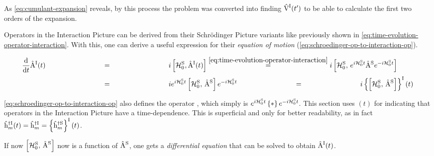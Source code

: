As \autoref{eq:cumulant-expansion} reveals, by this process the problem was converted into finding $\VhamiltonianOf[\interactionPicture]{t'}$ to be able to calculate the first two orders of the expansion.

Operators in the Interaction Picture can be derived from their Schrödinger Picture variants like previously shown in \autoref{eq:time-evolution-operator-interaction}. 
With this, one can derive a useful expression for their \emph{equation of motion} (\autoref{eq:schroedinger-op-to-interaction-op}).

\begin{equation}
    \label{eq:schroedinger-op-to-interaction-op}
    \begin{split}
        \difft{}\AopOfT[\interactionPicture] &\stackrel{\phantom{\ref{eq:time-evolution-operator-interaction}}}{=} i \left[\HzeroHamiltonian[\schroedingerPicture], \AopOfT[\interactionPicture]\right]
        \stackrel{\ref{eq:time-evolution-operator-interaction}}{=}
        i \left[\HzeroHamiltonian[\schroedingerPicture],\,e^{i \HzeroHamiltonian[\schroedingerPicture]{} t} \Aop[\schroedingerPicture] e^{-i \HzeroHamiltonian[\schroedingerPicture]{} t}\right]\\
        &\stackrel{\phantom{\ref{eq:time-evolution-operator-interaction}}}{=}
        i e^{i \HzeroHamiltonian[\schroedingerPicture]{} t}\left[\HzeroHamiltonian[\schroedingerPicture],\, \Aop[\schroedingerPicture]\right]e^{-i \HzeroHamiltonian[\schroedingerPicture]{} t}
        \stackrel{\phantom{\ref{eq:time-evolution-operator-interaction}}}{=}
        i \interactionTimeEvolution{\left[\HzeroHamiltonian[\schroedingerPicture],\, \Aop[\schroedingerPicture]\right]}
    \end{split}
\end{equation}

\autoref{eq:schroedinger-op-to-interaction-op} also defines the operator \interactionTimeEvolution{\ast}, which simply is $e^{i \HzeroHamiltonian[\schroedingerPicture]{} t} \left\{\ast \right\} e^{-i \HzeroHamiltonian[\schroedingerPicture]{} t}$.
This section uses $(t)$ for indicating that operators in the Interaction Picture have a time-dependence. 
This is superficial and only for better readability, as in fact $\hopOfT[\interactionPicture]{m}{\dagger} = \hop[\interactionPicture]{m}{\dagger} = \interactionTimeEvolution{\hop[\schroedingerPicture]{m}{\dagger}}$.

If now $\left[\HzeroHamiltonian[\schroedingerPicture],\, \Aop[\schroedingerPicture]\right]$ now is a function of $\Aop[\schroedingerPicture]$, one gets a \emph{differential equation} that can be solved to obtain $\AopOfT[\interactionPicture]$.

